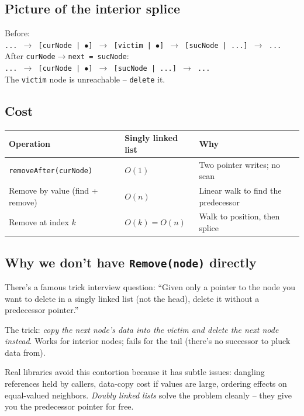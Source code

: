 \documentclass[11pt]{article}
\begin{document}
\subsection*{Picture of the interior splice}

\begin{center}
\footnotesize
Before:\\
\texttt{... $\to$ [curNode | $\bullet$] $\to$ [victim | $\bullet$] $\to$ [sucNode | ...] $\to$ ...}
\\[0.5em]
After \texttt{curNode$\to$next = sucNode}:\\
\texttt{... $\to$ [curNode | $\bullet$] $\to$ [sucNode | ...] $\to$ ...}
\\[0.5em]
The \texttt{victim} node is unreachable -- \texttt{delete} it.
\end{center}

\subsection{Cost}

\begin{center}
\footnotesize
\renewcommand{\arraystretch}{1.3}
\begin{tabular}{@{}lll@{}}
\hline
\textbf{Operation}                & \textbf{Singly linked list} & \textbf{Why} \\
\hline
\texttt{removeAfter(curNode)}     & $O(1)$                      & Two pointer writes; no scan \\
Remove by value (find + remove)   & $O(n)$                      & Linear walk to find the predecessor \\
Remove at index $k$               & $O(k) = O(n)$               & Walk to position, then splice \\
\hline
\end{tabular}
\end{center}

\subsection{Why we don't have \texttt{Remove(node)} directly}

\begin{ideabox}
There's a famous trick interview question: ``Given only a pointer
to the node you want to delete in a singly linked list (not the
head), delete it without a predecessor pointer.''

The trick: \emph{copy the next node's data into the victim and
delete the next node instead}. Works for interior nodes; fails for
the tail (there's no successor to pluck data from).

Real libraries avoid this contortion because it has subtle issues:
dangling references held by callers, data-copy cost if values are
large, ordering effects on equal-valued neighbors. \emph{Doubly
linked lists} solve the problem cleanly -- they give you the
predecessor pointer for free.
\end{ideabox}
\end{document}
